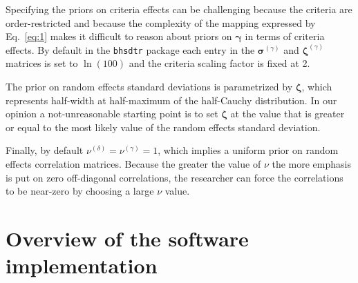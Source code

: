 \documentclass[oneside,a4paper]{article}
\begin{document}
Specifying the priors on criteria effects can be challenging because
the criteria are order-restricted and because the complexity of the
mapping expressed by Eq.~\ref{eq:1} makes it difficult to reason about
priors on $\bm{\gamma}$ in terms of criteria effects. By default in
the \texttt{bhsdtr} package each entry in the $\bm{\sigma}^{(\gamma)}$
and $\bm{\zeta}^{(\gamma)}$ matrices is set to $\ln(100)$ and the
criteria scaling factor is fixed at 2.


The prior on random effects standard deviations is parametrized by
$\bm{\zeta}$, which represents half-width at half-maximum of the
half-Cauchy distribution. In our opinion a not-unreasonable starting
point is to set $\bm{\zeta}$ at the value that is greater or equal to
the most likely value of the random effects standard deviation.

Finally, by default $\nu^{(\delta)} = \nu^{(\gamma)} = 1$, which
implies a uniform prior on random effects correlation
matrices. Because the greater the value of $\nu$ the more emphasis is
put on zero
off-diagonal correlations, the researcher can force the correlations
to be near-zero by choosing a large $\nu$ value.

\section{Overview of the software implementation}
\end{document}
